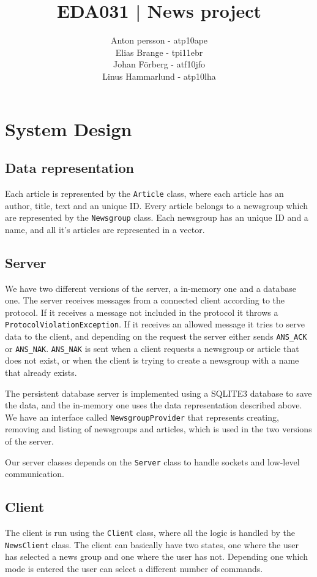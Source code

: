 \documentclass[12pt]{article}
\title{EDA031 | News project}
\author{Anton persson - atp10ape\\
		Elias Brange - tpi11ebr\\
		Johan Förberg - atf10jfo\\
		Linus Hammarlund - atp10lha}
\begin{document}
\maketitle
\newpage

\section{System Design}

\subsection{Data representation}
Each article is represented by the \verb!Article! class, where each article has an author, title, text and an unique ID. Every article belongs to a newsgroup which are represented by the \verb!Newsgroup! class. Each newsgroup has an unique ID and a name, and all it's articles are represented in a vector.

\subsection{Server}
We have two different versions of the server, a in-memory one and a database one. The server receives messages from a connected client according to the protocol. If it receives a message not included in the protocol it throws a \verb!ProtocolViolationException!. If it receives an allowed message it tries to serve data to the client, and depending on the request the server either sends \verb!ANS_ACK! or \verb!ANS_NAK!. \verb!ANS_NAK! is sent when a client requests a newsgroup or article that does not exist, or when the client is trying to create a newsgroup with a name that already exists.

The persistent database server is implemented using a SQLITE3 database to save the data, and the in-memory one uses the data representation described above. We have an interface called \verb!NewsgroupProvider! that represents creating, removing and listing of newsgroups and articles, which is used in the two versions of the server.

Our server classes depends on the \verb!Server! class to handle sockets and low-level communication.

\subsection{Client}
The client is run using the \verb!Client! class, where all the logic is handled by the \verb!NewsClient! class. The client can basically have two states, one where the user has selected a news group and one where the user has not. Depending one which mode is entered the user can select a different number of commands.
\end{document}
